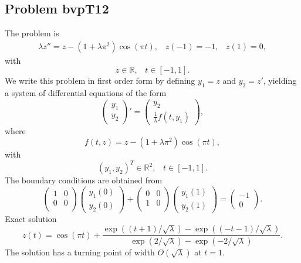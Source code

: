 \documentclass[<options>]{article}
\def \RR {{\mathbb{R}}}
\begin{document}
\subsection{Problem bvpT12}\label{test12}
The problem is 
\begin{eqnarray*}
\lambda z'' =  z  - (1 +\lambda \pi^{2}) \cos(\pi t), \;\;\;z(-1) = -1, \;\;\; z(1) = 0,
\end{eqnarray*}
with
\[
z \in \RR, \;\;\; t\in [-1,1].
\]
We write this problem in first order form by defining $y_1=z$ and $y_2=z'$, yielding a system of differential equations of the form
\begin{equation*}
\left(\begin{array}{c}
y_1\\
y_2
\end{array}\right)'=
\left(\begin{array}{c}
y_2\\
\frac{1}{\lambda}f(t,y_1)
\end{array}\right),
\end{equation*}
where
\begin{equation*}
f(t,z) = z  - (1 +\lambda \pi^{2}) \cos(\pi t),
\end{equation*}
with
\[
(y_1,y_2)^T \in \RR^{2}, \;\;\;  t \in [-1,1].
\]
The  boundary conditions are obtained from
\begin{equation*}
\left(
  \begin{array}{cc}
    1 & 0 \\
    0 & 0 \\
  \end{array}
\right)
\left(\begin{array}{c}
y_{1}(0)\\
y_{2}(0)
\end{array}\right)
+
\left(
  \begin{array}{cc}
    0 & 0 \\
    1 & 0 \\
  \end{array}
\right)
\left(\begin{array}{c}
y_{1}(1)\\
y_{2}(1)
\end{array}\right)=\left(\begin{array}{c}
-1 \\
0
\end{array}\right).
\end{equation*}
\textrm{Exact solution}
$$z(t) = \cos(\pi t) +  \frac{\displaystyle{\exp((t + 1) / \sqrt\lambda) - \exp((-t -1) / \sqrt\lambda)}}
{\displaystyle{\exp(2 / \sqrt\lambda) - \exp(-2 / \sqrt\lambda)}}.$$
The solution has a turning point of width $O(\sqrt\lambda)$  at $t = 1.$
\end{document}
